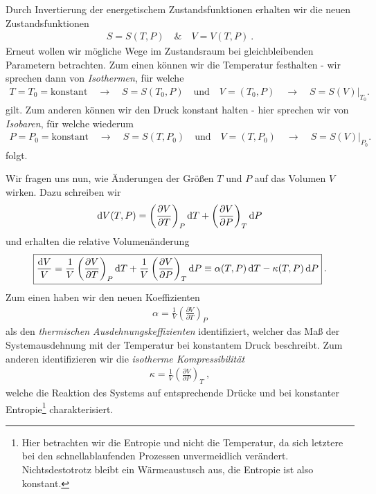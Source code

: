 Durch Invertierung der energetischem Zustandsfunktionen erhalten wir die neuen Zustandsfunktionen 
\begin{align*}
    \boxed{S=S(T,P) \quad\&\quad V=V(T,P)}\:.
\end{align*} 
Erneut wollen wir mögliche Wege im Zustandsraum bei gleichbleibenden Parametern betrachten.
Zum einen können wir die Temperatur festhalten - wir sprechen dann von \emph{Isothermen}, für welche 
\begin{align*}
    T=T_0=\text{konstant}\quad\rightarrow\quad S=S(T_0,P) \quad\text{und}\quad V=(T_0,P) \quad\rightarrow\quad S=S(V)|_{T_0}.
\end{align*} gilt.
Zum anderen können wir den Druck konstant halten - hier sprechen wir von \emph{Isobaren}, für welche wiederum
\begin{align*}
    P=P_0=\text{konstant}\quad\rightarrow\quad S=S(T,P_0) \quad\text{und}\quad V=(T,P_0) \quad\rightarrow\quad S=S(V)|_{P_0}.
\end{align*} folgt.

Wir fragen uns nun, wie Änderungen der Größen $T$ und $P$ auf das Volumen $V$ wirken. Dazu schreiben wir  
\begin{align*}
    \mathop{}\!\mathrm{d} V (T,P)= \left( \frac{\partial V}{\partial T}\right)_P \mathop{}\!\mathrm{d} T+\left( \frac{\partial V}{\partial P}\right)_T \mathop{}\!\mathrm{d} P
\end{align*} 
und erhalten die relative Volumenänderung 
\begin{align*}
    \boxed{\frac{\mathop{}\!\mathrm{d} V}{V}=\frac{1}{V}\left( \frac{\partial V}{\partial T}\right)_P\mathop{}\!\mathrm{d} T+\frac{1}{V}\left( \frac{\partial V}{\partial P}\right)_T\mathop{}\!\mathrm{d} P \equiv \alpha(T,P)\mathop{}\!\mathrm{d} T-\kappa(T,P)\mathop{}\!\mathrm{d} P}\:.
\end{align*} 
Zum einen haben wir den neuen Koeffizienten
\begin{align*}
    \boxed{\alpha=\frac{1}{V}\left( \frac{\partial V}{\partial T}\right)_P}
\end{align*}
als den \emph{thermischen Ausdehnungskeffizienten} identifiziert, welcher das Maß der Systemausdehnung mit der Temperatur bei konstantem Druck beschreibt. Zum anderen identifizieren wir die \emph{isotherme Kompressibilität}
\begin{align*}
    \boxed{\kappa=\frac{1}{V}\left( \frac{\partial V}{\partial P}\right)_T}\:,
\end{align*} 
welche die Reaktion des Systems auf entsprechende Drücke und bei konstanter Entropie\footnote{Hier betrachten wir die Entropie und nicht die Temperatur, da sich letztere bei den schnellablaufenden Prozessen unvermeidlich verändert. Nichtsdestotrotz bleibt ein Wärmeaustusch aus, die Entropie ist also konstant.} charakterisiert.


